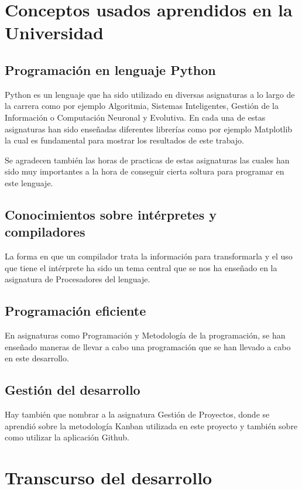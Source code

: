


\section{Conceptos usados aprendidos en la Universidad}

\subsection{Programación en lenguaje Python}
Python es un lenguaje que ha sido utilizado en diversas asignaturas a lo largo de la carrera como por ejemplo Algoritmia, Sistemas Inteligentes, Gestión de la Información o Computación Neuronal y Evolutiva. En cada una de estas asignaturas han sido enseñadas diferentes librerías como por ejemplo Matplotlib la cual es fundamental para mostrar los resultados de este trabajo.

Se agradecen también las horas de practicas de estas asignaturas las cuales han sido muy importantes a la hora de conseguir cierta soltura para programar en este lenguaje.

\subsection{Conocimientos sobre intérpretes y compiladores}
La forma en que un compilador trata la información para transformarla y el uso que tiene el intérprete ha sido un tema central que se nos ha enseñado en la asignatura de Procesadores del lenguaje. 

\subsection{Programación eficiente}
En asignaturas como Programación y Metodología de la programación, se han enseñado maneras de llevar a cabo una programación que se han llevado a cabo en este desarrollo.

\subsection{Gestión del desarrollo}
Hay también que nombrar a la asignatura Gestión de Proyectos, donde se aprendió sobre la metodología Kanban utilizada en este proyecto y también sobre como utilizar la aplicación Github. 

\section{Transcurso del desarrollo}

